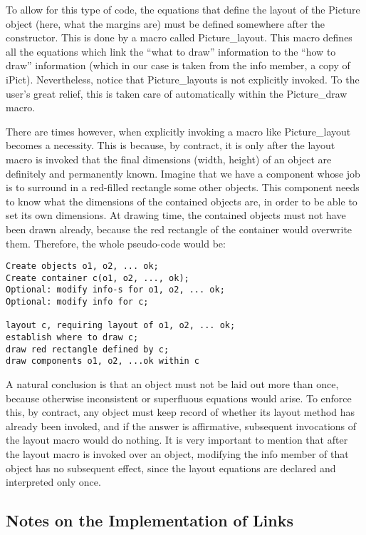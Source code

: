 \documentclass{article}
\newcommand{\code}{\ttfamily}
\begin{document}
To allow for this type of code, the equations that define the layout of the {\code Picture} object (here, what the margins are)
must be defined somewhere after the constructor. This is done by a macro called {\code Picture\_layout}.
This macro defines all the equations which link the ``what to draw'' information to the ``how to draw''
information (which in our case is taken from the {\code info} member, a copy of {\code iPict}).
Nevertheless, notice that {\code Picture\_layouts} is not explicitly invoked. To the user's
great relief, this is taken care of automatically within the {\code Picture\_draw} macro.

There are times however, when explicitly invoking a macro like {\code Picture\_layout}
becomes a necessity. This is because, by contract, it is only after the {\code layout}
macro is invoked that the final dimensions (width, height) of an object are
definitely and permanently known. Imagine that we have a component whose job is to
surround in a red-filled rectangle some other objects. This component
needs to know what the dimensions of the contained objects are, in order to be able to set
its own dimensions. At drawing time, the contained objects must not have been drawn already,
because the red rectangle of the container would overwrite them.
Therefore, the whole pseudo-code would be:
\begin{verbatim}
Create objects o1, o2, ... ok;
Create container c(o1, o2, ..., ok);
Optional: modify info-s for o1, o2, ... ok;
Optional: modify info for c;

layout c, requiring layout of o1, o2, ... ok;
establish where to draw c;
draw red rectangle defined by c;
draw components o1, o2, ...ok within c
\end{verbatim}

A natural conclusion is that an object must not be laid out more than once, because otherwise
inconsistent or superfluous equations would arise. To enforce this, by contract,
any object must keep record of whether its layout method has already been invoked,
and if the answer is affirmative, subsequent invocations of the layout macro would
do nothing. It is very important to mention that after the {\code layout} macro is
invoked over an object, modifying the {\code info} member of that object has
no subsequent effect, since the layout equations are declared and interpreted only once.

\subsection{Notes on the Implementation of Links}
\end{document}
